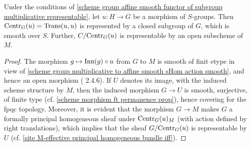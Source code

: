 \begin{corollary}\label{scheme group multiplicative to affine smooth centralizer quotient representable}
Under the conditions of \cref{scheme group affine smooth functor of subgroup multiplicative representable}, let $u:H\to G$ be a morphism of $S$-groups. Then $\mathrm{Centr}_G(u)=\mathrm{Trans}(u,u)$ is represented by a closed subgroup of $G$, which is smooth over $S$. Further, $C/\mathrm{Centr}_G(u)$ is representable by an open subscheme of $M$.
\end{corollary}
\begin{proof}
The morphism $g\mapsto\mathrm{Inn}(g)\circ u$ from $G$ to $M$ is smooth of finit etype in view of \cref{scheme group multiplicative to affine smooth sHom action smooth}, and hence an open morphism (\cite{EGA4-2} 2.4.6). If $U$ denotes its image, with the induced scheme structure by $M$, then the induced morphism $G\to U$ is smooth, surjective, of finite type (cf. \cref{scheme morphism ft permanence prop}), hence covering for the fpqc topology. Moreover, it is evident that the morphism $G\to M$ makes $G$ a formally principal homogeneous sheaf under $\mathrm{Centr}_G(u)_M$ (with action defined by right translations), which implies that the sheaf $G/\mathrm{Centr}_G(u)$ is representable by $U$ (cf. \cref{site M-effective principal homogeneous bundle iff}).
\end{proof}

